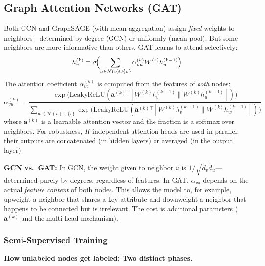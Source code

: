 \begin{notechapter}
\subsection{Graph Attention Networks (GAT)~\cite{semi-supervised-graphs:velivckovic2018}}

Both GCN and GraphSAGE (with mean aggregation) assign \emph{fixed} weights to
neighbors---determined by degree (GCN) or uniformly (mean-pool). But some
neighbors are more informative than others. GAT learns to attend selectively:
\begin{equation}
h_v^{(k)} = \sigma\!\Bigl(\sum_{u \in \mathcal{N}(v)\cup\{v\}}
\alpha_{vu}^{(k)}W^{(k)}h_u^{(k-1)}\Bigr)
\end{equation}
The attention coefficient $\alpha_{vu}^{(k)}$ is computed from the features of
\emph{both} nodes:
\begin{equation}
\alpha_{vu}^{(k)} = 
\frac{\exp\bigl(\text{LeakyReLU}(\mathbf{a}^{(k)\top}[W^{(k)}h_v^{(k-1)} \|
W^{(k)}h_u^{(k-1)}])\bigr)}{\sum_{w \in \mathcal{N}(v)\cup\{v\}}
\exp\bigl(\text{LeakyReLU}(\mathbf{a}^{(k)\top}[W^{(k)}h_v^{(k-1)} \|
W^{(k)}h_w^{(k-1)}])\bigr)}
\end{equation}
where $\mathbf{a}^{(k)}$ is a learnable attention vector and the fraction is a
softmax over neighbors. For robustness, $H$ independent attention heads are
used in parallel: their outputs are concatenated (in hidden layers) or averaged
(in the output layer).

\begin{insightbox}
\textbf{GCN vs.\ GAT:} In GCN, the weight given to neighbor $u$ is
$1/\sqrt{\tilde{d}_v\tilde{d}_u}$---determined purely by degrees, regardless
of features. In GAT, $\alpha_{vu}$ depends on the actual \emph{feature content}
of both nodes. This allows the model to, for example, upweight a neighbor that
shares a key attribute and downweight a neighbor that happens to be connected
but is irrelevant. The cost is additional parameters ($\mathbf{a}^{(k)}$ and
the multi-head mechanism).
\end{insightbox}

\subsubsection{Semi-Supervised Training}

\begin{correctionbox}
\textbf{How unlabeled nodes get labeled: Two distinct phases.}


\end{correctionbox}
\end{notechapter}
